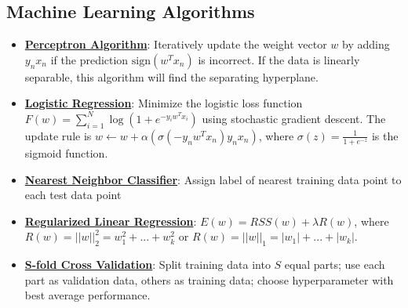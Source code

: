 \documentclass{article}%
\begin{document}
%
\subsection{Machine Learning Algorithms}%
\label{subsec:MachineLearningAlgorithms}%
\begin{itemize}[leftmargin=*]%
\item \href{https://purdue.brightspace.com/d2l/common/assets/pdfjs-d2l-dist/1.0.14-legacy/web/viewer.html?file=\%2Fcontent\%2Fenforced\%2F1095467-wl.202510.CS.24300.001\%2F05L2-ML Basics.pdf\%3Fou\%3D1095467\&lang=en-us\&container=d2l-fileviewer-rendered-pdf\&fullscreen=d2l-fileviewer-rendered-pdf-dialog\&height=667#page=30}{\textbf{Perceptron Algorithm}}: Iteratively update the weight vector $w$ by adding $y_nx_n$ if the prediction $\text{sign}(w^Tx_n)$ is incorrect. If the data is linearly separable, this algorithm will find the separating hyperplane.%
\item \href{https://purdue.brightspace.com/d2l/common/assets/pdfjs-d2l-dist/1.0.14-legacy/web/viewer.html?file=\%2Fcontent\%2Fenforced\%2F1095467-wl.202510.CS.24300.001\%2F05L2-ML Basics.pdf\%3Fou\%3D1095467\&lang=en-us\&container=d2l-fileviewer-rendered-pdf\&fullscreen=d2l-fileviewer-rendered-pdf-dialog\&height=667#page=31}{\textbf{Logistic Regression}}: Minimize the logistic loss function $F(w) = \sum_{i=1}^{N} \log(1 + e^{-y_iw^Tx_i})$ using stochastic gradient descent. The update rule is $w \leftarrow w + \alpha(\sigma(-y_nw^Tx_n)y_nx_n)$, where $\sigma(z) = \frac{1}{1 + e^{-z}}$ is the sigmoid function.%
\item \href{https://purdue.brightspace.com/d2l/common/assets/pdfjs-d2l-dist/1.0.14-legacy/web/viewer.html?file=\%2Fcontent\%2Fenforced\%2F1095467-wl.202510.CS.24300.001\%2F07L2-Vision.pdf\%3Fou\%3D1095467\&lang=en-us\&container=d2l-fileviewer-rendered-pdf\&fullscreen=d2l-fileviewer-rendered-pdf-dialog\&height=667#page=30}{\textbf{Nearest Neighbor Classifier}}: Assign label of nearest training data point to each test data point%
\item \href{https://purdue.brightspace.com/d2l/common/assets/pdfjs-d2l-dist/1.0.14-legacy/web/viewer.html?file=\%2Fcontent\%2Fenforced\%2F1095467-wl.202510.CS.24300.001\%2F10L1-CrossValidation.pdf\%3Fou\%3D1095467\&lang=en-us\&container=d2l-fileviewer-rendered-pdf\&fullscreen=d2l-fileviewer-rendered-pdf-dialog\&height=667#page=17}{\textbf{Regularized Linear Regression}}: $E(w) = RSS(w) + \lambda R(w)$, where $R(w) = ||w||_2^2 = w_1^2 + ... + w_k^2$ or $R(w) = ||w||_1 = |w_1| + ... + |w_k|$.%
\item \href{https://purdue.brightspace.com/d2l/common/assets/pdfjs-d2l-dist/1.0.14-legacy/web/viewer.html?file=\%2Fcontent\%2Fenforced\%2F1095467-wl.202510.CS.24300.001\%2F10L1-CrossValidation.pdf\%3Fou\%3D1095467\&lang=en-us\&container=d2l-fileviewer-rendered-pdf\&fullscreen=d2l-fileviewer-rendered-pdf-dialog\&height=667#page=25}{\textbf{S-fold Cross Validation}}: Split training data into $S$ equal parts; use each part as validation data, others as training data; choose hyperparameter with best average performance.%

\end{itemize}
\end{document}
